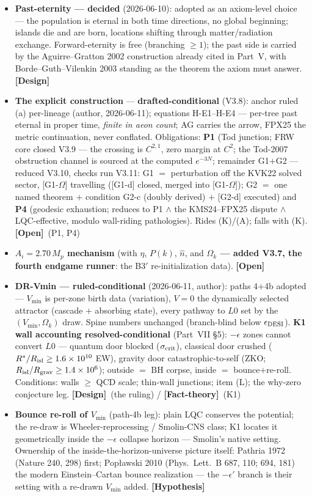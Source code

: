 \documentclass[11pt]{article}
\newcommand{\factth}{\textcolor{green!40!black}{\textbf{[Fact-theory]}}}
\newcommand{\hyp}{\textcolor{orange!80!black}{\textbf{[Hypothesis]}}}
\newcommand{\design}{\textcolor{blue!60!black}{\textbf{[Design]}}}
\newcommand{\open}{\textcolor{red!70!black}{\textbf{[Open]}}}
\begin{document}
\begin{itemize}[leftmargin=2.6em,itemsep=3pt]
\item[\textbf{(H)}] \textbf{Past-eternity --- decided} (2026-06-10): adopted as an axiom-level choice --- the population is eternal in both time directions, no global beginning; islands die and are born, locations shifting through matter/radiation exchange. Forward-eternity is free (branching $\ge1$); the past side is carried by the Aguirre--Gratton 2002 construction already cited in Part~V, with Borde--Guth--Vilenkin 2003 standing as the theorem the axiom must answer. \design
\item[\textbf{(H1)}] \textbf{The explicit construction} --- \textbf{drafted-conditional} (V3.8): anchor ruled (a) per-lineage (author, 2026-06-11); equations H-E1--H-E4 --- per-tree past eternal in proper time, \emph{finite in aeon count}; AG carries the arrow, FPX25 the metric continuation, never conflated. Obligations: \textbf{P1} (Tod junction; FRW core closed V3.9 --- the crossing is $C^{2,1}$, zero margin at $C^2$; the Tod-2007 obstruction channel is sourced at the computed $e^{-3N}$; remainder G1$+$G2 --- reduced V3.10, checks run V3.11: G1 $=$ perturbation off the KVK22 solved sector, [G1-$\Omega$] travelling ([G1-d] closed, merged into [G1-$\Omega$]); G2 $=$ one named theorem $+$ condition G2-c (doubly derived) $+$ [G2-d] executed) and \textbf{P4} (geodesic exhaustion; reduces to P1 $\wedge$ the KMS24--FPX25 dispute $\wedge$ LQC-effective, modulo wall-riding pathologies). Rides (K)/(A); falls with (K). \open\ (P1, P4)
\item[\textbf{(I)}] \textbf{$A_i=2.70\,M_p$ mechanism} (with $\eta$, $P(k)$, $\hat n$, and \textbf{$\Omega_k$ --- added V3.7, the fourth endgame runner}: the B3$'$ re-initialization data). \open
\item[\textbf{(K)}] \textbf{DR-Vmin --- ruled-conditional} (2026-06-11, author): paths 4$+$4b adopted --- $V_{\min}$ is per-zone birth data (variation), $V=0$ the dynamically selected attractor (cascade $+$ absorbing state), every pathway to $L0$ set by the $(V_{\min},\Omega_k)$ draw. Spine numbers unchanged (branch-blind below $\epsilon_{\rm DESI}$). \textbf{K1 wall accounting resolved-conditional} (Part~VII \S5): $-\epsilon$ zones cannot convert $L0$ --- quantum door blocked ($\sigma_{\rm crit}$), classical door crushed ($R^*/R_{\rm isl}\ge1.6\times10^{10}$ EW), gravity door catastrophic-to-self (ZKO; $R_{\rm isl}/R_{\rm grav}\ge1.4\times10^{6}$); outside $=$ BH corpse, inside $=$ bounce$+$re-roll. Conditions: walls $\ge$ QCD scale; thin-wall junctions; item (L); the why-zero conjecture leg. \design\ (the ruling) / \factth\ (K1)
\item[\textbf{(L)}] \textbf{Bounce re-roll of $V_{\min}$} (path-4b leg): plain LQC conserves the potential; the re-draw is Wheeler-reprocessing / Smolin-CNS class; K1 locates it geometrically inside the $-\epsilon$ collapse horizon --- Smolin's native setting. Ownership of the inside-the-horizon-universe picture itself: Pathria 1972 (Nature 240, 298) first; Pop\l awski 2010 (Phys.\ Lett.\ B 687, 110; 694, 181) the modern Einstein--Cartan bounce realization --- the $-\epsilon'$ branch is their setting with a re-drawn $V_{\min}$ added. \hyp


\end{itemize}
\end{document}

